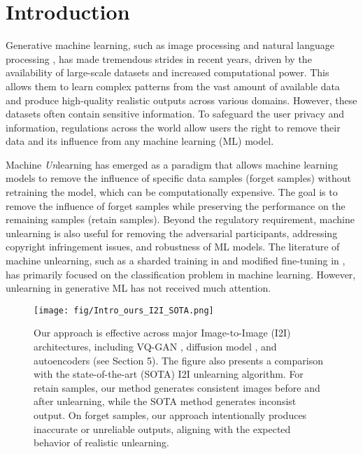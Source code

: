 \section{Introduction}
\label{sec:intro}

Generative machine learning, such as image processing \cite{dhariwal2021diffusion} and natural language processing \cite{achiam2023gpt}, has made tremendous strides in recent years, driven by the availability of large-scale datasets and increased computational power. This allows them to learn complex patterns from the vast amount of available data and produce high-quality realistic outputs across various domains. However, these datasets often contain sensitive information. To safeguard the user privacy and information, regulations across the world allow users the right to remove their data and its influence from any machine learning (ML) model. 

Machine \textit{Un}learning \cite{cao2015towards} has emerged as a paradigm that allows machine learning models to remove the influence of specific data samples (forget samples) without retraining the model, which can be computationally expensive. The goal is to remove the influence of forget samples while preserving the performance on the remaining samples (retain samples). Beyond the regulatory requirement, machine unlearning is also useful for removing the adversarial participants, addressing copyright infringement issues, and robustness of ML models. The literature of machine unlearning, such as a sharded training in \cite{bourtoule2021machine} and modified fine-tuning in \cite{tarun2023fast}, has primarily focused on the classification problem in machine learning. However, unlearning in generative ML has not received much attention.

\begin{figure*}
  \centering
    \texttt{[image: fig/Intro\_ours\_I2I\_SOTA.png]}
    \caption{Our approach is effective across major Image-to-Image (I2I) architectures, including VQ-GAN \cite{li2023mage}, diffusion model \cite{saharia2022palette}, and autoencoders (see Section 5). The figure also presents a comparison with the state-of-the-art (SOTA) I2I unlearning algorithm. For retain samples, our method generates consistent images before and after unlearning, while the SOTA method generates inconsist output. On forget samples, our approach intentionally produces inaccurate or unreliable outputs, aligning with the expected behavior of realistic unlearning.}
    \label{fig:Intro_Realistic_I2I}
\end{figure*}

